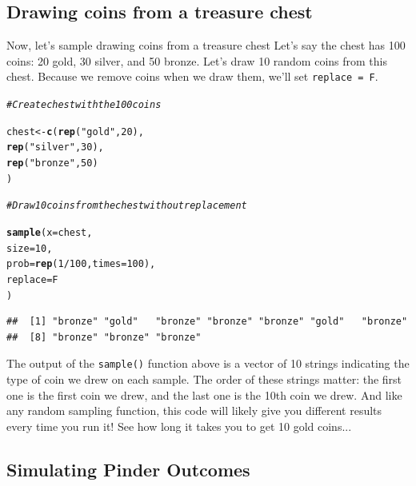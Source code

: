 \documentclass{tufte-book}\usepackage[]{graphicx}\usepackage[]{color}
\makeatletter
\newcommand{\hlnum}[1]{\textcolor[rgb]{0.686,0.059,0.569}{#1}}%
\newcommand{\hlstr}[1]{\textcolor[rgb]{0.192,0.494,0.8}{#1}}%
\newcommand{\hlcom}[1]{\textcolor[rgb]{0.678,0.584,0.686}{\textit{#1}}}%
\newcommand{\hlopt}[1]{\textcolor[rgb]{0,0,0}{#1}}%
\newcommand{\hlstd}[1]{\textcolor[rgb]{0.345,0.345,0.345}{#1}}%
\newcommand{\hlkwb}[1]{\textcolor[rgb]{0.69,0.353,0.396}{#1}}%
\newcommand{\hlkwc}[1]{\textcolor[rgb]{0.333,0.667,0.333}{#1}}%
\newcommand{\hlkwd}[1]{\textcolor[rgb]{0.737,0.353,0.396}{\textbf{#1}}}%
\newenvironment{kframe}{%
 \def\at@end@of@kframe{}%
 \ifinner\ifhmode%
  \def\at@end@of@kframe{\end{minipage}}%
  \begin{minipage}{\columnwidth}%
 \fi\fi%
 \def\FrameCommand##1{\hskip\@totalleftmargin \hskip-\fboxsep
 \colorbox{shadecolor}{##1}\hskip-\fboxsep
     \hskip-\linewidth \hskip-\@totalleftmargin \hskip\columnwidth}%
 \MakeFramed {\advance\hsize-\width
   \@totalleftmargin\z@ \linewidth\hsize
   \@setminipage}}%
 {\par\unskip\endMakeFramed%
 \at@end@of@kframe}
\newenvironment{knitrout}{}{} %
\makeatother
\begin{document}
\subsection{Drawing coins from a treasure chest}

Now, let's sample drawing coins from a treasure chest Let's say the chest has 100 coins: 20 gold, 30 silver, and 50 bronze. Let's draw 10 random coins from this chest. Because we remove coins when we draw them, we'll set \texttt{replace = F}.

\begin{knitrout}
\color{fgcolor}\begin{kframe}
\begin{alltt}
\hlcom{# Create chest with the 100 coins}

\hlstd{chest} \hlkwb{<-} \hlkwd{c}\hlstd{(}\hlkwd{rep}\hlstd{(}\hlstr{"gold"}\hlstd{,} \hlnum{20}\hlstd{),}
         \hlkwd{rep}\hlstd{(}\hlstr{"silver"}\hlstd{,} \hlnum{30}\hlstd{),}
         \hlkwd{rep}\hlstd{(}\hlstr{"bronze"}\hlstd{,} \hlnum{50}\hlstd{)}
         \hlstd{)}

\hlcom{# Draw 10 coins from the chest without replacement}

\hlkwd{sample}\hlstd{(}\hlkwc{x} \hlstd{= chest,}
       \hlkwc{size} \hlstd{=} \hlnum{10}\hlstd{,}
       \hlkwc{prob} \hlstd{=} \hlkwd{rep}\hlstd{(}\hlnum{1} \hlopt{/} \hlnum{100}\hlstd{,} \hlkwc{times} \hlstd{=} \hlnum{100}\hlstd{),}
       \hlkwc{replace} \hlstd{= F}
       \hlstd{)}
\end{alltt}
\begin{verbatim}
##  [1] "bronze" "gold"   "bronze" "bronze" "bronze" "gold"   "bronze"
##  [8] "bronze" "bronze" "bronze"
\end{verbatim}
\end{kframe}
\end{knitrout}

The output of the \texttt{sample()} function above is a vector of 10 strings indicating the type of coin we drew on each sample. The order of these strings matter: the first one is the first coin we drew, and the last one is the 10th coin we drew. And like any random sampling function, this code will likely give you different results every time you run it! See how long it takes you to get 10 gold coins...

\subsection{Simulating Pinder Outcomes}
\end{document}
